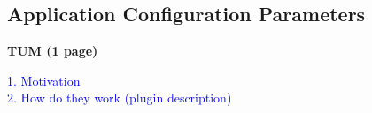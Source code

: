 \subsection{Application Configuration Parameters} \label{sec:acp}
\textbf{TUM (1 page)}

\textcolor{blue}{
1. Motivation \\
2. How do they work (plugin description)
}